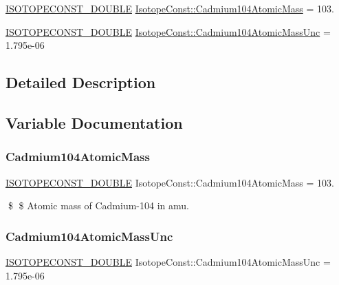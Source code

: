 \begin{DoxyCompactItemize}
\item 
\mbox{\hyperlink{group___isotope_const-_macros_ga8f45a7272ce02c0b4c65c44636ed719a}{I\+S\+O\+T\+O\+P\+E\+C\+O\+N\+S\+T\+\_\+\+D\+O\+U\+B\+LE}} \mbox{\hyperlink{group___isotope_const-_cadmium-_cd104_gacf49ec875203cfda95c9226c9045f157}{Isotope\+Const\+::\+Cadmium104\+Atomic\+Mass}} = 103.
\item 
\mbox{\hyperlink{group___isotope_const-_macros_ga8f45a7272ce02c0b4c65c44636ed719a}{I\+S\+O\+T\+O\+P\+E\+C\+O\+N\+S\+T\+\_\+\+D\+O\+U\+B\+LE}} \mbox{\hyperlink{group___isotope_const-_cadmium-_cd104_gaff9c16fdcf55e72ae1c5ad6f44be172d}{Isotope\+Const\+::\+Cadmium104\+Atomic\+Mass\+Unc}} = 1.\+795e-\/06
\end{DoxyCompactItemize}


\subsection{Detailed Description}


\subsection{Variable Documentation}
\mbox{\label{group___isotope_const-_cadmium-_cd104_gacf49ec875203cfda95c9226c9045f157}} 
\subsubsection{\texorpdfstring{Cadmium104\+Atomic\+Mass}{Cadmium104AtomicMass}}
{\footnotesize\ttfamily \mbox{\hyperlink{group___isotope_const-_macros_ga8f45a7272ce02c0b4c65c44636ed719a}{I\+S\+O\+T\+O\+P\+E\+C\+O\+N\+S\+T\+\_\+\+D\+O\+U\+B\+LE}} Isotope\+Const\+::\+Cadmium104\+Atomic\+Mass = 103.}

\$ \$ Atomic mass of Cadmium-\/104 in amu. \mbox{\label{group___isotope_const-_cadmium-_cd104_gaff9c16fdcf55e72ae1c5ad6f44be172d}} 
\subsubsection{\texorpdfstring{Cadmium104\+Atomic\+Mass\+Unc}{Cadmium104AtomicMassUnc}}
{\footnotesize\ttfamily \mbox{\hyperlink{group___isotope_const-_macros_ga8f45a7272ce02c0b4c65c44636ed719a}{I\+S\+O\+T\+O\+P\+E\+C\+O\+N\+S\+T\+\_\+\+D\+O\+U\+B\+LE}} Isotope\+Const\+::\+Cadmium104\+Atomic\+Mass\+Unc = 1.\+795e-\/06}

